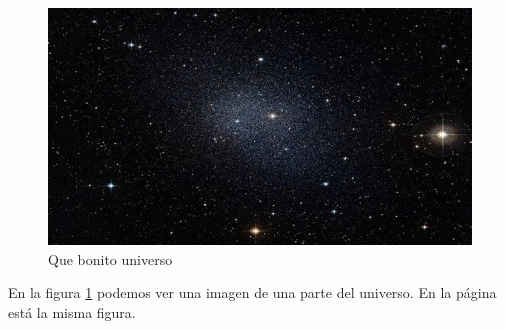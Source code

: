 \documentclass{article}
\begin{document}
\begin{figure}
	\centering
	\includegraphics[scale=0.25]{universe.jpg}
	\caption{Que bonito universo}
	\label{fig:uni}
\end{figure}
En la figura \ref{fig:uni} podemos ver una imagen de una parte del universo. En la p\'agina \pageref{fig:uni} est\'a la misma figura.
\end{document}

